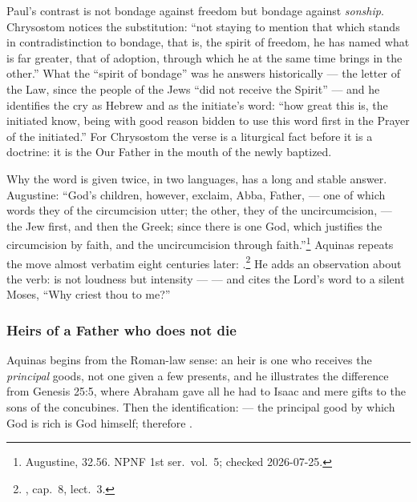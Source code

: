 Paul's contrast is not bondage against freedom but bondage against
\emph{sonship}. Chrysostom notices the substitution: ``not staying to mention
that which stands in contradistinction to bondage, that is, the spirit of
freedom, he has named what is far greater, that of adoption, through which he
at the same time brings in the other.'' What the ``spirit of bondage'' was he
answers historically --- the letter of the Law, since the people of the Jews
``did not receive the Spirit'' --- and he identifies the cry  as
Hebrew and as the initiate's word: ``how great this is, the initiated know,
being with good reason bidden to use this word first in the Prayer of the
initiated.'' For Chrysostom the verse is a liturgical fact before it is a
doctrine: it is the Our Father in the mouth of the newly baptized.

Why the word is given twice, in two languages, has a long and stable answer.
Augustine: ``God's children, however, exclaim, Abba, Father, --- one of which
words they of the circumcision utter; the other, they of the uncircumcision,
--- the Jew first, and then the Greek; since there is one God, which justifies
the circumcision by faith, and the uncircumcision through faith.''\footnote{
Augustine,  32.56. NPNF 1st ser.\ vol.\ 5; checked
2026-07-25.} Aquinas repeats the move almost verbatim eight centuries later:
.\footnote{, cap.\ 8, lect.\ 3.} He adds an
observation about the verb:  is not loudness but intensity ---
 ---
and cites the Lord's word to a silent Moses, ``Why criest thou to me?''

\subsubsection*{Heirs of a Father who does not die}

 Aquinas begins from the Roman-law sense: an heir is
one who receives the \emph{principal} goods, not one given a few presents, and
he illustrates the difference from Genesis 25:5, where Abraham gave all he had
to Isaac and mere gifts to the sons of the concubines. Then the identification:
 --- the
principal good by which God is rich is God himself; therefore .

